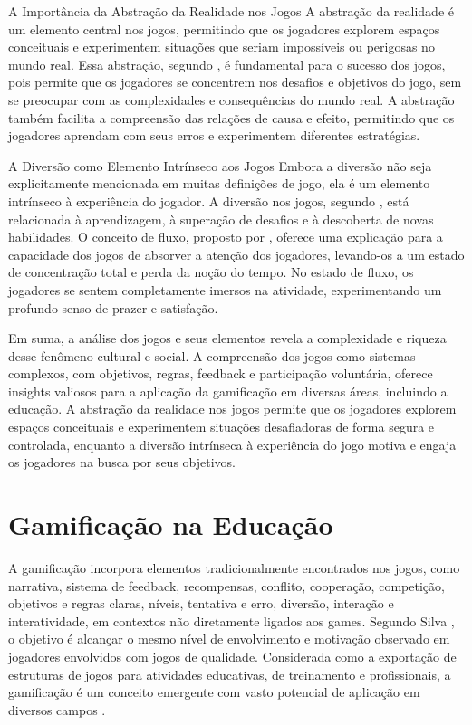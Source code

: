 A Importância da Abstração da Realidade nos Jogos
A abstração da realidade é um elemento central nos jogos, permitindo que os jogadores explorem espaços conceituais e experimentem situações que seriam impossíveis ou perigosas no mundo real. Essa abstração, segundo \cite{koster2005theory}, é fundamental para o sucesso dos jogos, pois permite que os jogadores se concentrem nos desafios e objetivos do jogo, sem se preocupar com as complexidades e consequências do mundo real. A abstração também facilita a compreensão das relações de causa e efeito, permitindo que os jogadores aprendam com seus erros e experimentem diferentes estratégias.

A Diversão como Elemento Intrínseco aos Jogos
Embora a diversão não seja explicitamente mencionada em muitas definições de jogo, ela é um elemento intrínseco à experiência do jogador. A diversão nos jogos, segundo \cite{koster2005theory}, está relacionada à aprendizagem, à superação de desafios e à descoberta de novas habilidades. O conceito de fluxo, proposto por \cite{csikszentmihalyi1990flow}, oferece uma explicação para a capacidade dos jogos de absorver a atenção dos jogadores, levando-os a um estado de concentração total e perda da noção do tempo. No estado de fluxo, os jogadores se sentem completamente imersos na atividade, experimentando um profundo senso de prazer e satisfação.

Em suma, a análise dos jogos e seus elementos revela a complexidade e riqueza desse fenômeno cultural e social. A compreensão dos jogos como sistemas complexos, com objetivos, regras, feedback e participação voluntária, oferece insights valiosos para a aplicação da gamificação em diversas áreas, incluindo a educação. A abstração da realidade nos jogos permite que os jogadores explorem espaços conceituais e experimentem situações desafiadoras de forma segura e controlada, enquanto a diversão intrínseca à experiência do jogo motiva e engaja os jogadores na busca por seus objetivos.

\section{Gamificação na Educação}

A gamificação incorpora elementos tradicionalmente encontrados nos jogos, como narrativa, sistema de feedback, recompensas, conflito, cooperação, competição, objetivos e regras claras, níveis, tentativa e erro, diversão, interação e interatividade, em contextos não diretamente ligados aos games. Segundo Silva \cite{silva2017gamificaccao}, o objetivo é alcançar o mesmo nível de envolvimento e motivação observado em jogadores envolvidos com jogos de qualidade. Considerada como a exportação de estruturas de jogos para atividades educativas, de treinamento e profissionais, a gamificação é um conceito emergente com vasto potencial de aplicação em diversos campos \cite{barbosa2021aplicativos, fardo2013gamificaccao}.

